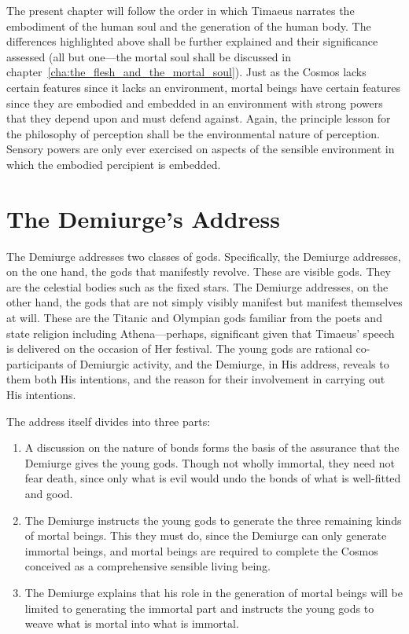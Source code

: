The present chapter will follow the order in which Timaeus narrates the embodiment of the human soul and the generation of the human body. The differences highlighted above shall be further explained and their significance assessed (all but one---the mortal soul shall be discussed in chapter~\ref{cha:the_flesh_and_the_mortal_soul}). Just as the Cosmos lacks certain features since it lacks an environment, mortal beings have certain features since they are embodied and embedded in an environment with strong powers that they depend upon and must defend against. Again, the principle lesson for the philosophy of perception shall be the environmental nature of perception. Sensory powers are only ever exercised on aspects of the sensible environment in which the embodied percipient is embedded.


\section{The Demiurge's Address} %
\label{sec:the_demiurge_addressing_the_gods}

The Demiurge addresses two classes of gods. Specifically, the Demiurge addresses, on the one hand, the gods that manifestly revolve. These are visible gods. They are the celestial bodies such as the fixed stars. The Demiurge addresses, on the other hand, the gods that are not simply visibly manifest but manifest themselves at will. These are the Titanic and Olympian gods familiar from the poets and state religion including Athena---perhaps, significant given that Timaeus' speech is delivered on the occasion of Her festival. The young gods are rational co-participants of Demiurgic activity, and the Demiurge, in His address, reveals to them both His intentions, and the reason for their involvement in carrying out His intentions.

The address itself divides into three parts:
\begin{enumerate}[(1)]
	\item A discussion on the nature of bonds forms the basis of the assurance that the Demiurge gives the young gods. Though not wholly immortal, they need not fear death, since only what is evil would undo the bonds of what is well-fitted and good.
	\item The Demiurge instructs the young gods to generate the three remaining kinds of mortal beings. This they must do, since the Demiurge can only generate immortal beings, and mortal beings are required to complete the Cosmos conceived as a comprehensive sensible living being.
	\item The Demiurge explains that his role in the generation of mortal beings will be limited to generating the immortal part and instructs the young gods to weave what is mortal into what is immortal.
\end{enumerate}



